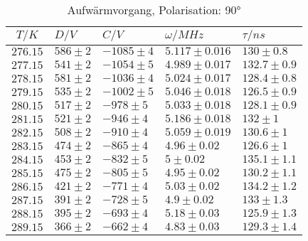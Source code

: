\begin{table}[h!]
\footnotesize\centering
\begin{tabular}{|c|l|l|l|l|}
\hline
$T/K$&$D/V$&$C/V$&$\omega/MHz$&$\tau/ns$\\\hline\hline
$276.15$&$586\pm2$&$-1085\pm4$&$5.117\pm0.016$&$130\pm0.8$\\\hline
$277.15$&$541\pm2$&$-1054\pm5$&$4.989\pm0.017$&$132.7\pm0.9$\\\hline
$278.15$&$581\pm2$&$-1036\pm4$&$5.024\pm0.017$&$128.4\pm0.8$\\\hline
$279.15$&$535\pm2$&$-1002\pm5$&$5.046\pm0.018$&$126.5\pm0.9$\\\hline
$280.15$&$517\pm2$&$-978\pm5$&$5.033\pm0.018$&$128.1\pm0.9$\\\hline
$281.15$&$521\pm2$&$-946\pm4$&$5.186\pm0.018$&$132\pm1$\\\hline
$282.15$&$508\pm2$&$-910\pm4$&$5.059\pm0.019$&$130.6\pm1$\\\hline
$283.15$&$474\pm2$&$-865\pm4$&$4.96\pm0.02$&$126.6\pm1$\\\hline
$284.15$&$453\pm2$&$-832\pm5$&$5\pm0.02$&$135.1\pm1.1$\\\hline
$285.15$&$475\pm2$&$-805\pm5$&$4.95\pm0.02$&$130.2\pm1.1$\\\hline
$286.15$&$421\pm2$&$-771\pm4$&$5.03\pm0.02$&$134.2\pm1.2$\\\hline
$287.15$&$391\pm2$&$-728\pm5$&$4.9\pm0.02$&$133\pm1.3$\\\hline
$288.15$&$395\pm2$&$-693\pm4$&$5.18\pm0.03$&$125.9\pm1.3$\\\hline
$289.15$&$366\pm2$&$-662\pm4$&$4.83\pm0.03$&$129.3\pm1.4$\\\hline
\end{tabular}
\caption{Aufwärmvorgang, Polarisation: 90°\label{warm90}}
\end{table}
